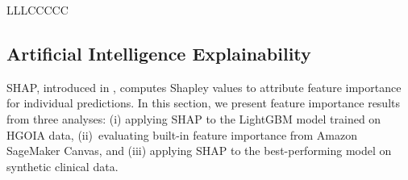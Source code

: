 \documentclass[diagnostics,article,accept,pdftex,moreauthors]{Definitions/mdpi}
\begin{document}
\begin{table}[H]
\begin{tabularx}{\linewidth}{LLLCCCCC}
\end{tabularx}
\end{table}



\subsection{Artificial Intelligence Explainability}
\label{sec:model-explainability}
\Ac{SHAP}, introduced in \cite{lundberg2017shap}, computes Shapley
values to attribute feature importance for individual predictions. In
this section, we present feature importance results from three
analyses: (i) applying SHAP to the LightGBM model trained on \ac{HGOIA}
data, \mbox{(ii) evaluating} built-in feature importance from
Amazon SageMaker Canvas, and (iii) applying SHAP to the best-performing
model on synthetic clinical data.

\end{document}

